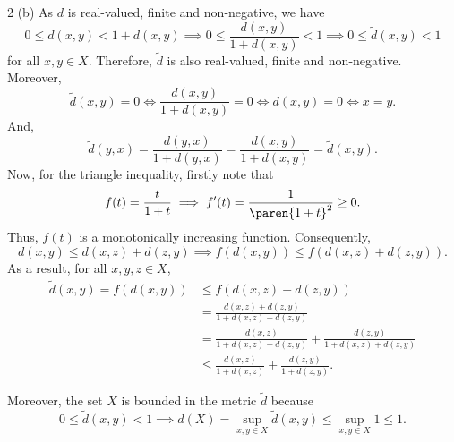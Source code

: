 \documentclass[11pt]{penrose}
\begin{document}
\begin{problem}{2 (b)}
    As $d$ is real-valued, finite and non-negative, we have
    \begin{equation*}
        0 \leq d(x,y) < 1 + d(x,y)
        \implies
        0 \leq \frac{d(x,y)}{1 + d(x,y)} < 1
        \implies
        0 \leq \tilde{d}(x,y) < 1
    \end{equation*}
    for all $x,y \in X$. Therefore, $\tilde{d}$ is also real-valued, finite and non-negative. Moreover,
    \begin{equation*}
        \tilde{d}(x,y) = 0
        \iff
        \frac{d(x,y)}{1 + d(x,y)} = 0
        \iff
        d(x,y) = 0
        \iff
        x = y.
    \end{equation*}
    And,
    \begin{equation*}
        \tilde{d}(y,x) = \frac{d(y,x)}{1 + d(y,x)} = \frac{d(x,y)}{1 + d(x,y)} = \tilde{d}(x,y).
    \end{equation*}
    Now, for the triangle inequality, firstly note that
    \begin{equation*}
        f(t) = \frac{t}{1+t} \implies f'(t) = \frac{1}{\paren{1+t}^{2}} \geq 0.
    \end{equation*}
    Thus, $f(t)$ is a monotonically increasing function. Consequently,
    \begin{equation*}
        d(x,y) \leq d(x,z) + d(z,y) \implies f(d(x,y)) \leq f(d(x,z) + d(z,y)).
    \end{equation*}
    As a result, for all $x,y,z \in X$,
    \begin{align*}
        \tilde{d}(x,y)
        = f(d(x,y))
        &\leq f(d(x,z) + d(z,y))\\
        &= \frac{d(x,z) + d(z,y)}{1 + d(x,z) + d(z,y)}\\
        &= \frac{d(x,z)}{1 + d(x,z) + d(z,y)} + \frac{d(z,y)}{1 + d(x,z) + d(z,y)}\\
        &\leq \frac{d(x,z)}{1 + d(x,z)} + \frac{d(z,y)}{1 + d(z,y)}.
    \end{align*}

    Moreover, the set $X$ is bounded in the metric $\tilde{d}$ because
    \begin{equation*}
        0 \leq \tilde{d}(x,y) < 1
        \implies
        d(X) = \sup_{x,y \in X} \tilde{d}(x,y) \leq \sup_{x,y \in X} 1 \leq 1.
    \end{equation*}
\end{problem}
\end{document}
